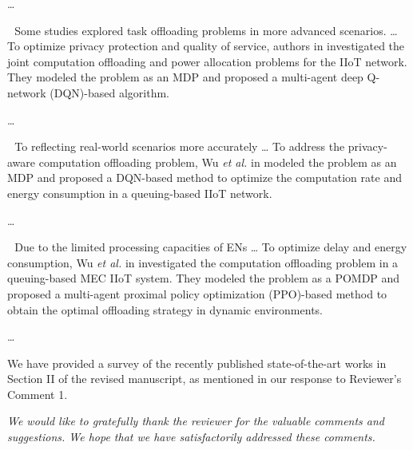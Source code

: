 \documentclass[12pt,draftclsnofoot,onecolumn]{IEEEtran}
\newenvironment{my}[2]%
{\begin{list}{}%
{\setlength{\rightmargin}{#1}\setlength{\leftmargin}{#2}}%


 \item[]{}

} {\end{list}}
\begin{document}
\begin{enumerate}
\begin{my}{1cm}{1cm}
{{				
				\dots
				
				\,\,\,\,Some studies explored task offloading problems in more advanced scenarios. \dots 
				To optimize privacy protection and quality of service, authors in \cite{wu2024privacy} investigated the joint computation offloading and power allocation problems for the IIoT network. They modeled the problem as an MDP and proposed a multi-agent deep Q-network (DQN)-based algorithm.
				
				\dots 
				
				\,\,\,\,To reflecting real-world scenarios more accurately \dots 
				To address the privacy-aware computation offloading problem, Wu \textit{et al.} in \cite{wu2024combining} modeled the problem as an MDP and proposed a DQN-based method to optimize the computation rate and energy consumption in a queuing-based IIoT network.
				
				
				\dots 
				
				\,\,\,\,Due to the limited processing capacities of ENs  \dots
				To optimize delay and energy consumption, Wu \textit{et al.} in \cite{wu2023multi} investigated the computation offloading problem in a queuing-based MEC IIoT system. They modeled the problem as a POMDP and proposed a multi-agent proximal policy optimization (PPO)-based method to obtain the optimal offloading strategy in dynamic environments.
				
				\dots
				
				
				
		}}
	\end{my}\vspace{6mm}

We have provided a survey of the recently published state-of-the-art works in Section II of the revised manuscript, as mentioned in our response to Reviewer's Comment 1.\newline


	
\end{enumerate}

\vspace{10mm}

\textit{We would like to gratefully thank the reviewer for the valuable comments and suggestions. We hope that we have satisfactorily addressed these comments.}\newline
\end{document}
